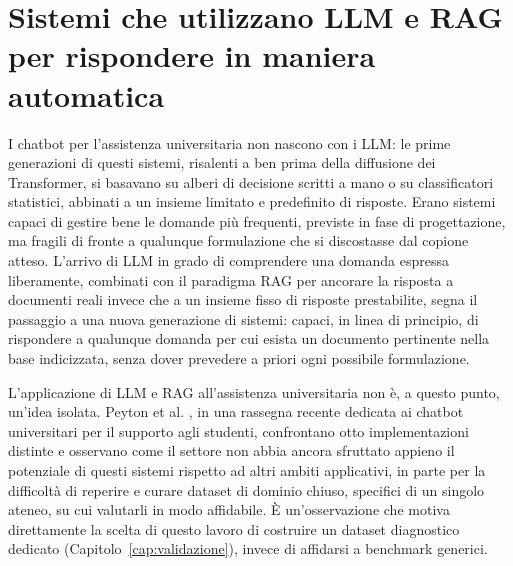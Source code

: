 \section{Sistemi che utilizzano LLM e RAG per rispondere in maniera automatica} \label{sec:sistemi-simili}

I chatbot per l'assistenza universitaria non nascono con i LLM: le prime generazioni di questi sistemi, risalenti a
ben prima della diffusione dei Transformer, si basavano su alberi di decisione scritti a mano o su classificatori
statistici, abbinati a un insieme limitato e predefinito di risposte. Erano sistemi capaci di gestire bene le
domande più frequenti, previste in fase di progettazione, ma fragili di fronte a qualunque formulazione che si
discostasse dal copione atteso. L'arrivo di LLM in grado di comprendere una domanda espressa liberamente, combinati
con il paradigma RAG per ancorare la risposta a documenti reali invece che a un insieme fisso di risposte
prestabilite, segna il passaggio a una nuova generazione di sistemi: capaci, in linea di principio, di rispondere a
qualunque domanda per cui esista un documento pertinente nella base indicizzata, senza dover prevedere a priori ogni
possibile formulazione.

L'applicazione di LLM e RAG all'assistenza universitaria non è, a questo punto, un'idea isolata. Peyton et al.
\cite{peyton2025review}, in una rassegna recente dedicata ai chatbot universitari per il supporto agli studenti,
confrontano otto implementazioni distinte e osservano come il settore non abbia ancora sfruttato appieno il
potenziale di questi sistemi rispetto ad altri ambiti applicativi, in parte per la difficoltà di reperire e curare
dataset di dominio chiuso, specifici di un singolo ateneo, su cui valutarli in modo affidabile. È un'osservazione
che motiva direttamente la scelta di questo lavoro di costruire un dataset diagnostico dedicato
(Capitolo~\ref{cap:validazione}), invece di affidarsi a benchmark generici.


